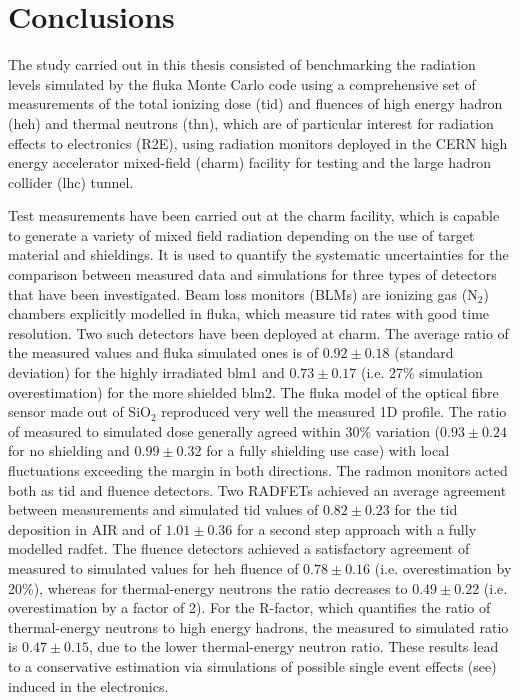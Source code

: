 \documentclass[encoding=utf8,british]{tumphthesis}
\begin{document}
\chapter{Conclusions}
\label{chapter:conclusion}

The study carried out in this thesis consisted of benchmarking the radiation levels simulated by the \acrshort{fluka} Monte Carlo code using a comprehensive set of measurements of the total ionizing dose (\acrshort{tid}) and fluences of high energy hadron (\acrshort{heh}) and thermal neutrons (\acrshort{thn}), which are of particular interest for radiation effects to electronics (R2E), using radiation monitors deployed in the CERN high energy accelerator mixed-field (\acrshort{charm}) facility for testing and the large hadron collider (\acrshort{lhc}) tunnel.

Test measurements have been carried out at the \acrshort{charm} facility, which is capable to generate a variety of mixed field radiation depending on the use of target material and shieldings. It is used to quantify the systematic uncertainties for the comparison between measured data and simulations for three types of detectors that have been investigated. Beam loss monitors (BLMs) are ionizing gas (N$_2$) chambers explicitly modelled in \acrshort{fluka}, which measure \acrshort{tid} rates with good time resolution. Two such detectors have been deployed at \acrshort{charm}. The average ratio of the measured values and \acrshort{fluka} simulated ones is of $0.92\pm0.18$ (standard deviation) for the highly irradiated \acrshort{blm}1 and $0.73 \pm 0.17$ (i.e. 27\% simulation overestimation) for the more shielded \acrshort{blm}2. The \acrshort{fluka} model of the optical fibre sensor made out of SiO$_2$ reproduced very well the measured 1D profile. The ratio of measured to simulated dose generally agreed within 30\% variation ($0.93\pm0.24$ for no shielding and $0.99 \pm 0.32$ for a fully shielding use case) with local fluctuations exceeding the margin in both directions. The \acrshort{radmon} monitors acted both as \acrshort{tid} and fluence detectors. Two RADFETs achieved an average agreement between measurements and simulated \acrshort{tid} values of $0.82\pm0.23$ for the \acrshort{tid} deposition in AIR and of $1.01\pm0.36$ for a second step approach with a fully modelled \acrshort{radfet}. The fluence detectors achieved a satisfactory agreement of measured to simulated values for \acrshort{heh} fluence of $0.78 \pm 0.16$ (i.e. overestimation by 20\%), whereas for thermal-energy neutrons the ratio decreases to $0.49 \pm 0.22$ (i.e. overestimation by a factor of 2). For the R-factor, which quantifies the ratio of thermal-energy neutrons to high energy hadrons, the measured to simulated ratio is $0.47 \pm 0.15$, due to the lower thermal-energy neutron ratio. These results lead to a conservative estimation via simulations of possible single event effects (\acrshort{see}) induced in the electronics.
\end{document}
